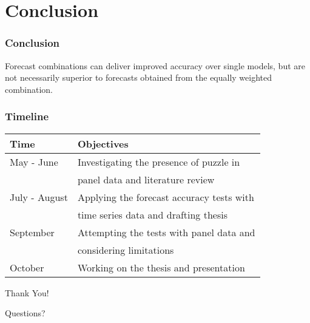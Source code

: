 
\section{Conclusion}

\begin{frame}
	\frametitle{Conclusion}
 
 Forecast combinations can deliver improved accuracy over single models, but are not necessarily superior to forecasts obtained from the equally weighted combination.

\end{frame}


\begin{frame}
	\frametitle{Timeline}
 
 \begin{table}[htbp]
  \centering
    \begin{tabular}{ll}
    Time  & Objectives \\
    \midrule
    May - June & Investigating the presence of puzzle in \\
               & panel data and literature review \\
    \midrule
    July - August & Applying the forecast accuracy tests with \\
                  & time series data and drafting thesis  \\
    \midrule
    September & Attempting the tests with panel data and \\
              & considering limitations \\
    \midrule
    October & Working on the thesis and presentation \\
    \bottomrule
    \end{tabular}
\end{table}


\end{frame}


\begin{frame}

     \begin{center}
        {\Huge\atchen Thank You!}
    \end{center}
    
    \bigskip
    
    \begin{center}
            {\LARGE Questions?}
    \end{center}
    
\end{frame}
